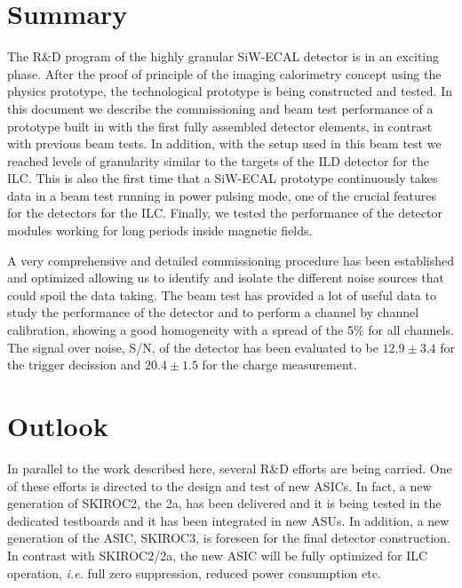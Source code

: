 \documentclass[a4paper,11pt]{article}
\begin{document}
\section{Summary}
\label{sec:summary}

The R\&D program of the highly granular SiW-ECAL detector is in an exciting phase. 
After the proof of principle of the imaging calorimetry concept using the physics prototype, the 
technological prototype is being constructed and tested. In this document we describe the commissioning and
beam test performance of a prototype built in with the first fully assembled
detector elements, in contrast with previous beam tests. In addition,
with the setup used in this beam test we reached levels of granularity
similar to the targets of the ILD detector for the ILC. This is also the first time
that a SiW-ECAL prototype continuously takes data in a beam test running in power pulsing mode, one of the crucial
features for the detectors for the ILC. Finally, we tested the performance of the detector
modules working for long periods inside magnetic fields.

A very comprehensive and detailed commissioning procedure has been established and optimized
allowing us to identify and isolate the different noise sources that could spoil the data taking.
The beam test has provided a lot of useful data to study 
the performance of the detector and to perform
a channel by channel calibration, showing a good homogeneity with a spread of the 5\% for all channels.
The signal over noise, S/N, of the detector has been evaluated to be $12.9\pm3.4$ for the trigger
decission and $20.4\pm1.5$ for the charge measurement.

\section{Outlook}
\label{sec:outlook}

In parallel to the work described here, several R\&D efforts are being carried.
One of these efforts is directed to the design and test of new ASICs.
In fact, a new generation of SKIROC2, the 2a, has been delivered
and it is being tested in the dedicated testboards and it has been integrated in new ASUs.
In addition, a new generation of the ASIC, SKIROC3, is foreseen for the final detector construction.
In contrast with SKIROC2/2a, the new ASIC will be fully optimized for ILC operation, {\it i.e.} full zero suppression, reduced power consumption etc.
\end{document}
